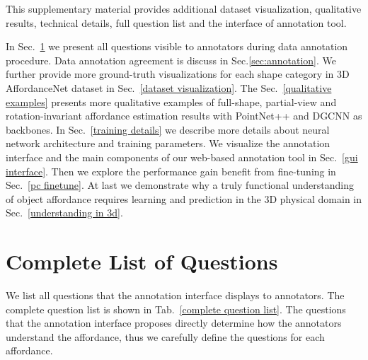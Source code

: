 \documentclass[final]{cvpr}
\begin{document}
This supplementary material provides additional dataset visualization, qualitative results, technical details, full question list and the interface of annotation tool.

In Sec.~\ref{complete list} we present all questions visible to annotators during data annotation procedure. Data annotation agreement is discuss in Sec.\ref{sec:annotation}. We further provide more ground-truth visualizations for each shape category in 3D AffordanceNet dataset in Sec.~\ref{dataset visualization}. The Sec.~\ref{qualitative examples} presents more qualitative examples of full-shape, partial-view and rotation-invariant affordance estimation results with PointNet++ and DGCNN as backbones. In Sec.~\ref{training details} we describe more details about neural network architecture and training parameters.  We visualize the annotation interface and the main components of our web-based annotation tool in Sec.~\ref{gui interface}. Then we explore the performance gain benefit from fine-tuning in Sec.~\ref{pc finetune}. At last we demonstrate why a truly functional understanding of object affordance requires learning and prediction in the 3D physical domain in Sec.~\ref{understanding in 3d}.

\section{Complete List of Questions} \label{complete list}

We list all questions that the annotation interface displays to annotators. The complete question list is shown in Tab.~\ref{complete question list}. The questions that the annotation interface proposes directly determine how the annotators understand the affordance, thus we carefully define the questions for each affordance. 
\end{document}
